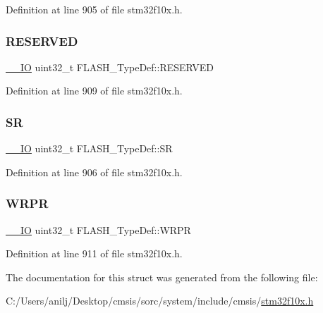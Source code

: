 Definition at line 905 of file stm32f10x.\+h.

\mbox{\label{struct_f_l_a_s_h___type_def_a32e5cc660e711dc5424f827e2d4efd88}} 
\subsubsection{\texorpdfstring{R\+E\+S\+E\+R\+V\+ED}{RESERVED}}
{\footnotesize\ttfamily \hyperlink{core__sc300_8h_aec43007d9998a0a0e01faede4133d6be}{\+\_\+\+\_\+\+IO} uint32\+\_\+t F\+L\+A\+S\+H\+\_\+\+Type\+Def\+::\+R\+E\+S\+E\+R\+V\+ED}



Definition at line 909 of file stm32f10x.\+h.

\mbox{\label{struct_f_l_a_s_h___type_def_a52c4943c64904227a559bf6f14ce4de6}} 
\subsubsection{\texorpdfstring{SR}{SR}}
{\footnotesize\ttfamily \hyperlink{core__sc300_8h_aec43007d9998a0a0e01faede4133d6be}{\+\_\+\+\_\+\+IO} uint32\+\_\+t F\+L\+A\+S\+H\+\_\+\+Type\+Def\+::\+SR}



Definition at line 906 of file stm32f10x.\+h.

\mbox{\label{struct_f_l_a_s_h___type_def_ac1889c0e17d868ab991f267ceb9dbb4b}} 
\subsubsection{\texorpdfstring{W\+R\+PR}{WRPR}}
{\footnotesize\ttfamily \hyperlink{core__sc300_8h_aec43007d9998a0a0e01faede4133d6be}{\+\_\+\+\_\+\+IO} uint32\+\_\+t F\+L\+A\+S\+H\+\_\+\+Type\+Def\+::\+W\+R\+PR}



Definition at line 911 of file stm32f10x.\+h.



The documentation for this struct was generated from the following file\+:\begin{DoxyCompactItemize}
\item 
C\+:/\+Users/anilj/\+Desktop/cmsis/sorc/system/include/cmsis/\hyperlink{stm32f10x_8h}{stm32f10x.\+h}\end{DoxyCompactItemize}
